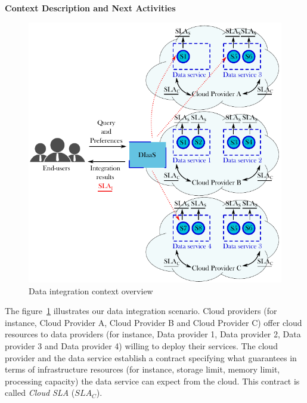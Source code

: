 \documentclass[12pt,a4paper,oneside]{article}
\begin{document}
\begin{center}
\textbf{\large{Context Description and Next Activities}}
\end{center}
\bigskip

\begin{figure}[b!]
\center
\includegraphics[scale=1]{figures/scenario.pdf}\caption{Data integration context overview}\label{fig:context}
\end{figure}

The figure~\ref{fig:context} illustrates our data integration scenario. Cloud providers (for instance, Cloud Provider A, Cloud Provider B and Cloud Provider C) offer cloud resources to data providers (for instance, Data provider 1, Data provider 2, Data provider 3 and Data provider 4) willing to deploy their services. The cloud provider and the data service establish a contract specifying what guarantees in terms of infrastructure resources (for instance, storage limit, memory limit, processing capacity) the data service can expect from the cloud. This contract is called \textsl{Cloud SLA} ($SLA_{C}$).
\end{document}
